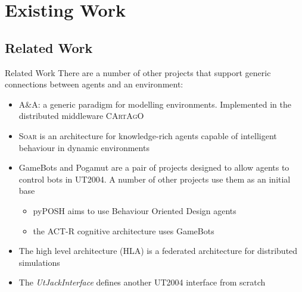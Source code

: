 \documentclass[t]{beamer}
\begin{document}
\section{Existing Work}
\subsection{Related Work}
\begin{frame}{Related Work}
	There are a number of other projects that support generic connections between agents and an environment:
	\pause
	\begin{itemize}[<+->]
		\item A\&A: a generic paradigm for modelling environments. Implemented in the distributed middleware \textsc{CArtAgO}
		\item \textsc{Soar} is an architecture for knowledge-rich agents capable of intelligent behaviour in dynamic environments
		\item GameBots and Pogamut are a pair of projects designed to allow agents to control bots in UT2004. A number of other projects use them as an initial base
		\begin{itemize}
			\item pyPOSH aims to use Behaviour Oriented Design agents
			\item the ACT-R cognitive architecture uses GameBots
		\end{itemize}
		\item The high level architecture (HLA) is a federated architecture for distributed simulations
		\item The \textit{UtJackInterface} defines another UT2004 interface from scratch
	\end{itemize}
\end{frame}
\end{document}
